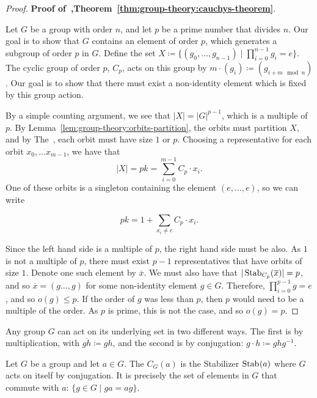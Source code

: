 \begin{proof}
  \textbf{Proof of~,Theorem~\ref{thm:group-theory:cauchys-theorem}}.

  Let \(G\) be a group with order \(n\), and let \(p\) be a prime number that divides \(n\). Our goal is to show that \(G\) contains an element of order \(p\), which generates a subgroup of order \(p\) in \(G\). Define the set \(X \coloneqq \{(g_{0}, \ldots, g_{n-1}) \mid \prod_{i=0}^{n-1}g_{i} = e\}\). The cyclic group of order \(p\), \(C_{p}\), acts on this group by \(m \cdot (g_{i}) \coloneqq (g_{i + m \mod n})\). Our goal is to show that there must exist a non-identity element which is fixed by this group action.

  By a simple counting argument, we see that \(|X| = |G|^{p-1}\), which is a multiple of \(p\). By Lemma~\ref{lem:group-theory:orbits-partition}, the orbits must partition \(X\), and by The~, each orbit must have size \(1\) or \(p\). Choosing a representative for each orbit \(x_{0}, \ldots x_{m-1}\), we have that
  \[|X| = pk = \sum_{i=0}^{m-1} C_{p} \cdot x_{i}.\]
  One of these orbits is a singleton containing the element \((e, \ldots, e)\), so we can write

  \[pk = 1 + \sum_{x_{i} \neq e} C_{p} \cdot x_{i}.\]

  Since the left hand side is a multiple of \(p\), the right hand side must be also. As \(1\) is not a multiple of \(p\), there must exist \(p-1\) representatives that have orbits of size \(1\). Denote one such element by \(\overline x\). We must also have that \(|\operatorname{Stab}_{C_{p}}(\overline x)| = p\), and so \(\overline x = (g \ldots, g)\) for some non-identity element \(g \in G\). Therefore, \(\prod_{i=0}^{p-1}g = e\), and so \(o(g) \leq p\). If the order of \(g\) was less than \(p\), then \(p\) would need to be a multiple of the order. As \(p\) is prime, this is not the case, and so \(o(g) = p\).
\end{proof}

\begin{example}
  Any group \(G\) can act on its underlying set in two different ways. The first is by multiplication, with \(g \dot h \coloneqq gh\), and the second is by conjugation: \(g \cdot h \coloneqq ghg^{-1}\).
\end{example}

\begin{definition}\label{def:group-theory:centralizer}
  Let \(G\) be a group and let \(a \in G\). The  \(C_{G}(a)\) is the Stabilizer \(\operatorname{Stab}_{}(a)\) where \(G\) acts on itself by conjugation. It is precisely the set of elements in \(G\) that commute with \(a\): \(\{g \in G \mid ga = ag\}\).
\end{definition}

